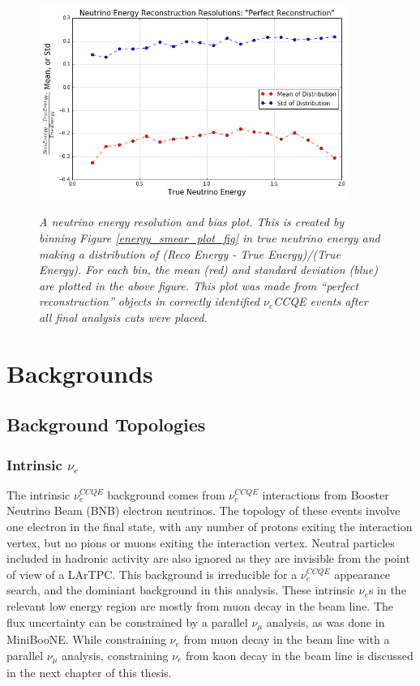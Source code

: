 \begin{figure}[ht!]
\centering
\includegraphics[width=0.9\textwidth]{Figures/LEE_EnergyRes_WithAnalysisCuts.png}\\%
\caption{\textit{A neutrino energy resolution and bias plot. This is created by binning Figure \ref{energy_smear_plot_fig} in true neutrino energy and making a distribution of (Reco Energy - True Energy)/(True Energy). For each bin, the mean (red) and standard deviation (blue) are plotted in the above figure. This plot was made from ``perfect reconstruction'' objects in correctly identified $\nu_e$CCQE events after all final analysis cuts were placed.}}
\label{energy_res_plot_fig}
\end{figure}

\section{Backgrounds}

\subsection{Background Topologies}\label{LEEbackgroundtopologiessection}

\subsubsection{Intrinsic $\nu_e$}
The intrinsic $\nu_e^{CCQE}$ background comes from $\nu_e^{CCQE}$ interactions from Booster Neutrino Beam (BNB) electron neutrinos. The topology of these events involve one electron in the final state, with any number of protons exiting the interaction vertex, but no pions or muons exiting the interaction vertex. Neutral particles included in hadronic activity are also ignored as they are invisible from the point of view of a LArTPC. This background is irreducible for a $\nu_e^{CCQE}$ appearance search, and the dominiant background in this analysis. These intrinsic $\nu_e$s in the relevant low energy region are mostly from muon decay in the beam line. The flux uncertainty can be constrained by a parallel $\nu_\mu$ analysis, as was done in MiniBooNE. While constraining $\nu_e$ from muon decay in the beam line with a parallel $\nu_\mu$ analysis, constraining $\nu_e$ from kaon decay in the beam line is discussed in the next chapter of this thesis.

